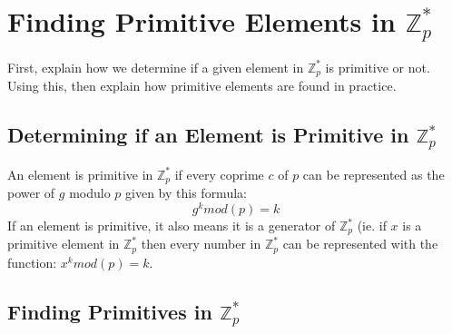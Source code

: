 \documentclass[12pt, letterpaper]{article}
\begin{document}
\section{Finding Primitive Elements in $\mathbb{Z}_p^*$}

First, explain how we determine if a given element in $\mathbb{Z}_p^*$ is primitive or not. 
Using this, then explain how primitive elements are found in practice. 

\subsection{Determining if an Element is Primitive in  $\mathbb{Z}_p^*$}
An element is primitive in  $\mathbb{Z}_p^*$ if every coprime $c$ of $p$ can be represented as the power of $g$ modulo $p$ given by this formula: $$g^k mod(p) = k$$ If an element is primitive, it also means it is a generator of $\mathbb{Z}_p^*$ (ie. if $x$ is a primitive element in  $\mathbb{Z}_p^*$ then every number in  $\mathbb{Z}_p^*$ can be represented with the function: $x^k mod(p) = k$.

\subsection{Finding Primitives in  $\mathbb{Z}_p^*$}
\end{document}
